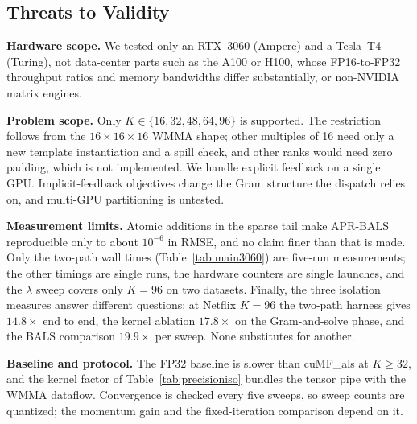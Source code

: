 \subsection{Threats to Validity}
\label{ssec:threats}

\textbf{Hardware scope.} We tested only an RTX~3060 (Ampere) and a Tesla~T4 (Turing), not data-center parts such as the A100 or H100, whose FP16-to-FP32 throughput ratios and memory bandwidths differ substantially, or non-NVIDIA matrix engines.

\textbf{Problem scope.} Only $K \in \{16, 32, 48, 64, 96\}$ is supported. The restriction follows from the $16 \times 16 \times 16$ WMMA shape; other multiples of 16 need only a new template instantiation and a spill check, and other ranks would need zero padding, which is not implemented. We handle explicit feedback on a single GPU. Implicit-feedback objectives change the Gram structure the dispatch relies on, and multi-GPU partitioning is untested.

\textbf{Measurement limits.} Atomic additions in the sparse tail make APR-BALS reproducible only to about $10^{-6}$ in RMSE, and no claim finer than that is made. Only the two-path wall times (Table~\ref{tab:main3060}) are five-run measurements; the other timings are single runs, the hardware counters are single launches, and the $\lambda$ sweep covers only $K=96$ on two datasets. Finally, the three isolation measures answer different questions: at Netflix $K=96$ the two-path harness gives $14.8\times$ end to end, the kernel ablation $17.8\times$ on the Gram-and-solve phase, and the BALS comparison $19.9\times$ per sweep. None substitutes for another.

\textbf{Baseline and protocol.} The FP32 baseline is slower than cuMF\_als at $K \ge 32$, and the kernel factor of Table~\ref{tab:precisioniso} bundles the tensor pipe with the WMMA dataflow. Convergence is checked every five sweeps, so sweep counts are quantized; the momentum gain and the fixed-iteration  comparison depend on it.
